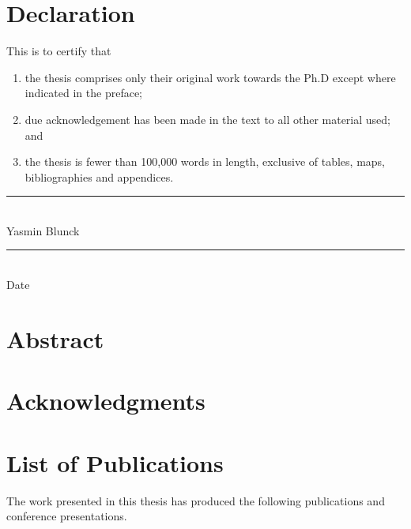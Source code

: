 \documentclass[11pt,a4paper]{book}
\begin{document}
	\thispagestyle{empty}


	\chapter*{Declaration}
	This is to certify that
	\begin{enumerate}[label=(\roman*)]
			\item the thesis comprises only their original work towards the Ph.D except where indicated in the preface;
			\item due acknowledgement has been made in the text to all other material used; and
		 \item the thesis is fewer than 100,000 words in length, exclusive of
	tables, maps, bibliographies and appendices.
	\end{enumerate}
	\vspace*{4cm}
	\begin{flushright}
	 \rule{0.4\textwidth}{0.4pt} \\
	 \vspace*{2mm}
	 Yasmin Blunck\\
	 \vspace*{2cm}
	 \rule{0.4\textwidth}{0.4pt} \\
	 \vspace*{2mm}
	Date
	\end{flushright}
	\thispagestyle{empty}
	\blankpage
	\thispagestyle{empty}

	
	
	\chapter*{Abstract} \renewcommand{\thepage}{\roman{page}}
	\blindtext
	 \blankpage
	
	\pagestyle{myStylePageNumberless}
	\vspace{-0.5cm}
	
	\chapter*{Acknowledgments}  
	\blindtext
	\blankpage
	
	
	\customFormat
	\chapter*{List of Publications} 
	\vspace{-1cm}
	The work presented in this thesis has produced the following publications and conference presentations.
\end{document}
